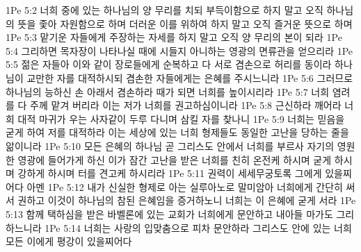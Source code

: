 1Pe 5:2  너희 중에 있는 하나님의 양 무리를 치되 부득이함으로 하지 말고 오직 하나님의 뜻을 좇아 자원함으로 하며 더러운 이를 위하여 하지 말고 오직 즐거운 뜻으로 하며
1Pe 5:3  맡기운 자들에게 주장하는 자세를 하지 말고 오직 양 무리의 본이 되라
1Pe 5:4  그리하면 목자장이 나타나실 때에 시들지 아니하는 영광의 면류관을 얻으리라
1Pe 5:5  젊은 자들아 이와 같이 장로들에게 순복하고 다 서로 겸손으로 허리를 동이라 하나님이 교만한 자를 대적하시되 겸손한 자들에게는 은혜를 주시느니라
1Pe 5:6  그러므로 하나님의 능하신 손 아래서 겸손하라 때가 되면 너희를 높이시리라
1Pe 5:7  너희 염려를 다 주께 맡겨 버리라 이는 저가 너희를 권고하심이니라
1Pe 5:8  근신하라 깨어라 너희 대적 마귀가 우는 사자같이 두루 다니며 삼킬 자를 찾나니
1Pe 5:9  너희는 믿음을 굳게 하여 저를 대적하라 이는 세상에 있는 너희 형제들도 동일한 고난을 당하는 줄을 앎이니라
1Pe 5:10  모든 은혜의 하나님 곧 그리스도 안에서 너희를 부르사 자기의 영원한 영광에 들어가게 하신 이가 잠간 고난을 받은 너희를 친히 온전케 하시며 굳게 하시며 강하게 하시며 터를 견고케 하시리라
1Pe 5:11  권력이 세세무궁토록 그에게 있을찌어다 아멘
1Pe 5:12  내가 신실한 형제로 아는 실루아노로 말미암아 너희에게 간단히 써서 권하고 이것이 하나님의 참된 은혜임을 증거하노니 너희는 이 은혜에 굳게 서라
1Pe 5:13  함께 택하심을 받은 바벨론에 있는 교회가 너희에게 문안하고 내아들 마가도 그리하느니라
1Pe 5:14  너희는 사랑의 입맞춤으로 피차 문안하라 그리스도 안에 있는 너희 모든 이에게 평강이 있을찌어다


